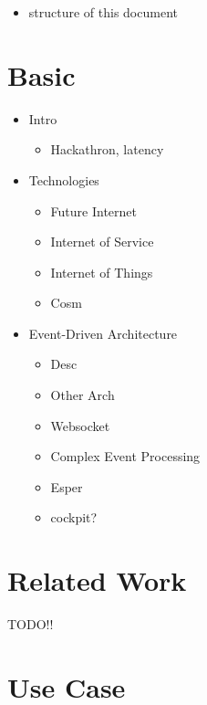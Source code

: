 \documentclass{acm_proc_article-sp}
\begin{document}
\begin{itemize}
\item structure of this document								 
\end{itemize}




\section{Basic}
\begin{itemize}
	\item Intro
	\begin{itemize}	
	\item Hackathron, latency
	\end{itemize}
	\item Technologies
	\begin{itemize}
	\item Future Internet
	\item Internet of Service
	\item Internet of Things
	\item Cosm
	\end{itemize}
	
	\item Event-Driven Architecture	
	\begin{itemize}
	\item Desc
	\item Other Arch
	\item Websocket	
	\item Complex Event Processing	
	\item Esper
	\item cockpit?
	\end{itemize}

\end{itemize}


\section{Related Work}

TODO!!

\section{Use Case}
\end{document}

